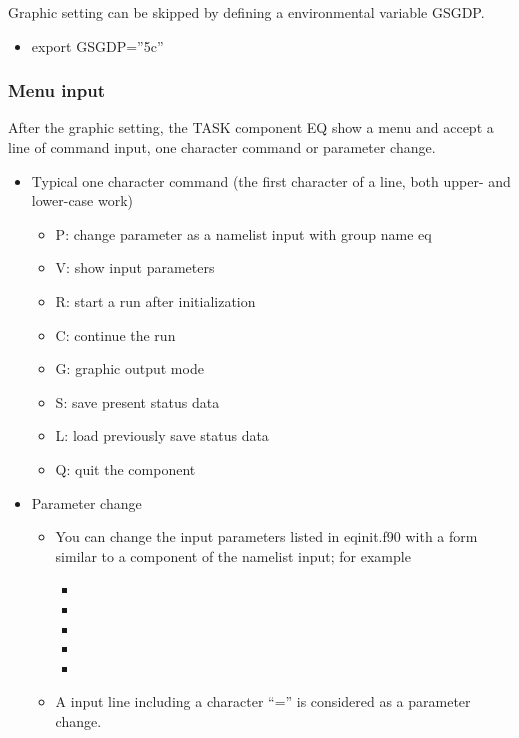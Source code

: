 \documentclass[11pt]{article}
\begin{document}
Graphic setting can be skipped by defining a environmental variable
GSGDP.
\begin{itemize}
\item[]
export GSGDP=''5c''
\end{itemize}

\subsubsection{Menu input}

After the graphic setting, the TASK component EQ show a menu and
accept a line of command input, one character command or parameter
change.

\begin{itemize}
\item
Typical one character command (the first character of a line, both
upper- and lower-case work)
\begin{itemize}
\item[]
P: change parameter as a namelist input with group name eq
\item[]
V: show input parameters
\item[]
R: start a run after initialization
\item[]
C: continue the run
\item[]
G: graphic output mode
\item[]
S: save present status data
\item[]
L: load previously save status data
\item[]
Q: quit the component
\end{itemize}
\item
Parameter change
\begin{itemize}
\item
You can change the input parameters listed in eqinit.f90 with a form
similar to a component of the namelist input; for example
\begin{itemize}
\item[]
\item[]
\item[]
\item[]
\item[]
\end{itemize}

\item
A input line including a character ``='' is considered as a parameter change.
\end{itemize}
\end{itemize}
\end{document}
